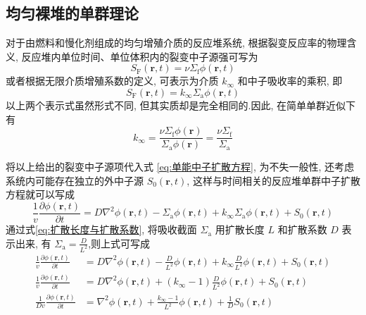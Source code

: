\documentclass{Sichuan Normal University}
\begin{document}
\subsection{均匀裸堆的单群理论}\label{sec:均匀裸堆的单群理论}
对于由燃料和慢化剂组成的均匀增殖介质的反应堆系统, 根据裂变反应率的物理含义, 反应堆内单位时间、单位体积内的裂变中子源强可写为
\begin{equation}
S_{\mathrm{F}}(\boldsymbol{r}, t)=\nu \Sigma_{\mathrm{f}} \phi(\boldsymbol{r}, t)
\end{equation}
或者根据无限介质增殖系数的定义, 可表示为介质 $k_{\infty}$ 和中子吸收率的乘积, 即
\begin{equation}
S_{\mathrm{F}}(\boldsymbol{r}, t)=k_{\infty} \Sigma_{\mathrm{a}} \phi(\boldsymbol{r}, t)
\end{equation}
以上两个表示式虽然形式不同, 但其实质却是完全相同的.因此, 在简单单群近似下有
\begin{equation}
k_{\infty}=\frac{\nu \Sigma_{\mathrm{f}} \phi(\boldsymbol{r})}{\Sigma_{\mathrm{a}} \phi(\boldsymbol{r})}=\frac{\nu \Sigma_{\mathrm{f}}}{\Sigma_{\mathrm{a}}}
\end{equation}

将以上给出的裂变中子源项代入式 \eqref{eq:单能中子扩散方程}, 为不失一般性, 还考虑系统内可能存在独立的外中子源 $S_0(\boldsymbol{r}, t)$, 这样与时间相关的反应堆单群中子扩散方程就可以写成
\begin{equation}
\frac{1}{v} \frac{\partial \phi(\boldsymbol{r}, t)}{\partial t}=D \nabla^2 \phi(\boldsymbol{r}, t)-\Sigma_{\mathrm{a}} \phi(\boldsymbol{r}, t)+k_{\infty} \Sigma_{\mathrm{a}} \phi(\boldsymbol{r}, t)+S_0(\boldsymbol{r}, t)
\label{eq:均匀裸堆的单群扩散方程42}
\end{equation}
通过式\eqref{eq:扩散长度与扩散系数}, 将吸收截面 $\Sigma_{\mathrm{a}}$ 用扩散长度 $L$ 和扩散系数 $D$ 表示出来, 有 $\Sigma_{\mathrm{a}}=\frac{D}{L^2}$,则上式可写成
\begin{align}
    \frac{1}{v} \frac{\partial \phi(\boldsymbol{r}, t)}{\partial t}&=D \nabla^2 \phi(\boldsymbol{r}, t)-\frac{D}{L^2} \phi(\boldsymbol{r}, t)+k_{\infty} \frac{D}{L^2} \phi(\boldsymbol{r}, t)+S_0(\boldsymbol{r}, t)\\
    \frac{1}{v} \frac{\partial \phi(\boldsymbol{r}, t)}{\partial t}&=D \nabla^2 \phi(\boldsymbol{r}, t)+\left(k_{\infty}-1\right) \frac{D}{L^2} \phi(\boldsymbol{r}, t)+S_0(\boldsymbol{r}, t)\\
    \frac{1}{Dv} \frac{\partial \phi(\boldsymbol{r}, t)}{\partial t}&=\nabla^2 \phi(\boldsymbol{r}, t)+\frac{k_{\infty}-1}{L^2} \phi(\boldsymbol{r}, t)+\frac{1}{D}S_0(\boldsymbol{r}, t)
    \label{eq:均匀裸堆的单群扩散方程1110}
\end{align}
\end{document}
